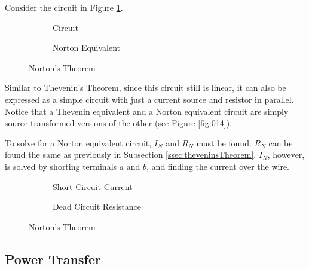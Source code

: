 \documentclass[12pt]{article}
\begin{document}
Consider the circuit in Figure \ref{fig:047}.
\begin{figure}[H]
  \centering
  \begin{subfigure}[H]{0.45\textwidth}
    \centering
    
    \caption{Circuit}
    \label{fig:047}
  \end{subfigure}
  \begin{subfigure}[H]{0.45\textwidth}
    \centering
    
    \caption{Norton Equivalent}
    \label{fig:048}
  \end{subfigure}
  \caption{Norton's Theorem}
  \label{fig:NortonTheoremOne}
  \vspace{-10pt}
\end{figure}
Similar to Thevenin's Theorem, since this circuit still is linear, it can also be expressed as a simple circuit with just a current source and resistor in parallel. Notice that a Thevenin equivalent and a Norton equivalent circuit are simply source transformed versions of the other (see Figure \ref{fig:014}).

To solve for a Norton equivalent circuit, $I_N$ and $R_N$ must be found. $R_N$ can be found the same as previously in Subsection \ref{ssec:theveninsTheorem}. $I_N$, however, is solved by shorting terminals $a$ and $b$, and finding the current over the wire.

\begin{figure}[H]
  \centering
  \begin{subfigure}[H]{0.45\textwidth}
    \centering
    
    \caption{Short Circuit Current}
    \label{fig:045}
  \end{subfigure}
  \begin{subfigure}[H]{0.45\textwidth}
    \centering
    
    \caption{Dead Circuit Resistance}
    \label{fig:046}
  \end{subfigure}
  \caption{Norton's Theorem}
  \label{fig:nortonsTheorem}
  \vspace{-10pt}
\end{figure}

\subsection{Power Transfer}
\label{ssec:powerTransfer}
\end{document}
